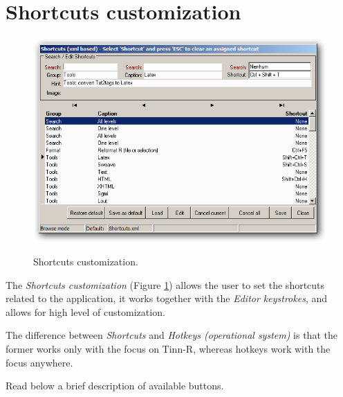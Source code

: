 
\hypertarget{working_shortcuts}{}
\section{Shortcuts customization}

\begin{figure}[h!]
  \includegraphics[scale=0.35]{./res/shortcuts_dlg.png}\\
  \caption{Shortcuts customization.}
  \label{fig:shortcuts_dlg_1}
\end{figure}

The \textit{Shortcuts customization}
(Figure \ref{fig:shortcuts_dlg_1})
allows the user to set the shortcuts related
to the application, it works together with the \textit{Editor keystrokes},
and allows for high level of customization.

The difference between \textit{Shortcuts} and \textit{Hotkeys (operational system)}
is that the former works only with the focus on Tinn-R, whereas hotkeys work
with the focus anywhere.

Read below a brief description of available buttons.

